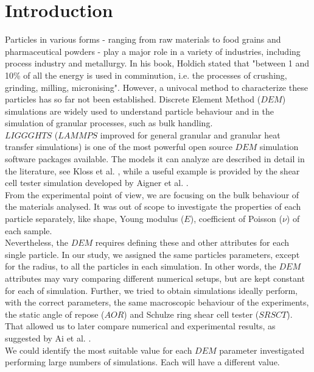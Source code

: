 \section{Introduction}
\label{sec:introduction}

Particles in various forms - ranging from raw materials to food grains and pharmaceutical powders - 
play a major role in a variety of industries, including process industry and metallurgy. 
In his book, Holdich \cite{RefWorks:117} stated that "between 1 and 10\% of all the energy 
is used in comminution, i.e. the processes of crushing, grinding, milling, micronising". 
However, a univocal method to characterize these particles has so far not been established. 
Discrete Element Method ($DEM$) simulations are widely used to understand particle behaviour 
and in the simulation of granular processes, such as bulk handling.\\
$LIGGGHTS$ ($LAMMPS$ improved for general granular and granular heat transfer
simulations) is one of the most powerful open source $DEM$ simulation software packages available. 
The models it can analyze are described in detail in the literature, see Kloss
et al. \cite{RefWorks:136}, while a useful example is provided by the shear cell tester 
simulation developed by Aigner et al. \cite{RefWorks:139}.\\
From the experimental point of view, we are focusing on the bulk behaviour of the materials analysed. 
It was out of scope to investigate the properties of each particle separately, like shape, 
Young modulus ($E$), coefficient of Poisson ($\nu$) of each sample.\\
Nevertheless, the $DEM$ requires defining these and other attributes for each
single particle.
In our study, we assigned the same particles parameters, except for the radius, to all the 
particles in each simulation. 
In other words, the $DEM$ attributes may vary comparing different 
numerical setups, but are kept constant for each of simulation. 
Further, we tried to obtain simulations ideally perform, with the correct parameters, 
the same macroscopic behaviour of the experiments, the static angle of repose
($AOR$) and Schulze ring shear cell tester ($SRSCT$). That allowed us to later
compare numerical and experimental results, as suggested by Ai et al.
\cite{RefWorks:131}.\\
We could identify the most suitable value for each $DEM$ parameter 
investigated performing large numbers of simulations. Each will have a different value. 
